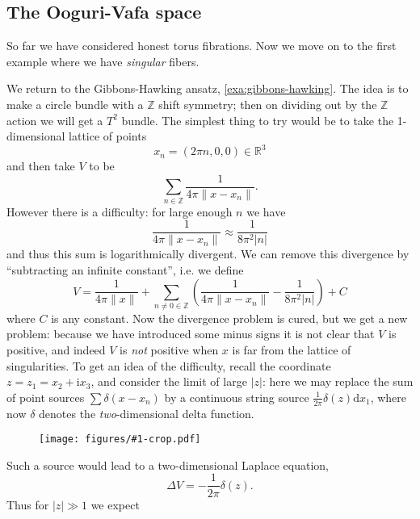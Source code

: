 \documentclass[12pt,letterpaper,reqno]{article}
\numberwithin{equation}{section}
\newcommand{\R}{\ensuremath{\mathbb R}}
\newcommand{\Z}{\ensuremath{\mathbb Z}}
\newcommand{\I}{{\mathrm i}}
\newcommand{\de}{\mathrm{d}}
\newcommand{\abs}[1]{\lvert#1\rvert}
\newcommand{\norm}[1]{\lVert#1\rVert}
\newcommand{\ti}[1]{\textit{#1}}
\newcommand{\insfig}[2]{\begin{figure}[htbp] \centering \texttt{[image: figures/\#1-crop.pdf]} \label{fig:#1} \end{figure}}
\begin{document}
\subsection{The Ooguri-Vafa space}

So far we have considered
honest torus fibrations. Now we move on to the first example 
where we have \ti{singular} fibers.

\begin{example} \label{exa:ooguri-vafa} \cite{OV1996} 
We return to the Gibbons-Hawking
ansatz, \autoref{exa:gibbons-hawking}. The idea is to make a circle
bundle with a $\Z$ shift symmetry; then on dividing out by the $\Z$
action we will get a $T^2$ bundle. The simplest thing to try
would be to take the 1-dimensional lattice of points
\begin{equation}
  x_n = (2 \pi n,0,0) \in \R^3
\end{equation}
and then take $V$ to be
\begin{equation}
 \sum_{n \in \Z} \frac{1}{4\pi\norm{x-x_n}}.
\end{equation}
However there is a difficulty: for large enough $n$
we have
\begin{equation}
  \frac{1}{4 \pi \norm{x-x_n}} \approx \frac{1}{8 \pi^2 \abs{n}}
\end{equation}
and thus this sum is logarithmically divergent. We
can remove this divergence by ``subtracting an infinite constant'',
i.e. we define
\begin{equation} \label{eq:ooguri-vafa-V}
  V = \frac{1}{4 \pi \norm{x}} + \sum_{n \neq 0 \in \Z} \left( \frac{1}{4\pi\norm{x-x_n}} - \frac{1}{8\pi^2 \abs{n}} \right) + C
\end{equation}
where $C$ is any constant.
Now the divergence problem is cured, but we get a 
new problem: because we have
introduced some minus signs it is not clear that $V$ 
is positive, and indeed $V$ is \ti{not} positive when
$x$ is far from the lattice of singularities.
To get an idea of the difficulty, recall the 
coordinate $z = z_1 = x_2 + \I x_3$,
and consider the limit of large $\abs{z}$: here
we may replace the sum of point sources $\sum \delta(x-x_n)$
by a continuous string source $\frac{1}{2\pi} \delta(z) \de x_1$, where now
$\delta$ denotes the \ti{two}-dimensional delta function.
\insfig{higgs-bundles-11}{1.1}
Such a source would lead to a two-dimensional Laplace equation,
\begin{equation}
  \Delta V = -\frac{1}{2\pi}\delta(z).
\end{equation} 
Thus for $\abs{z} \gg 1$ we expect

\end{example}
\end{document}
